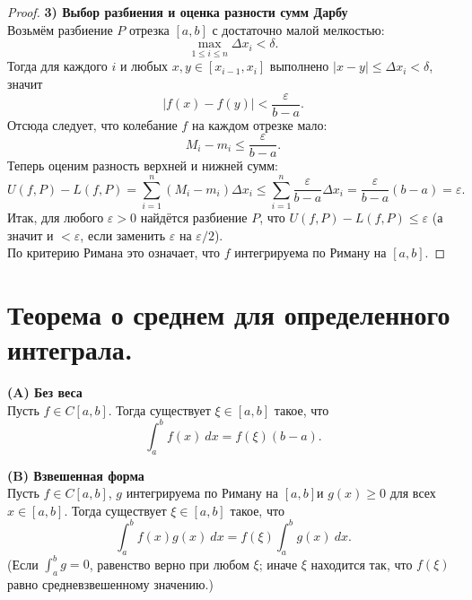 \documentclass[14pt]{extreport}
\begin{document}
\begin{proof}
        \textbf{3) Выбор разбиения и оценка разности сумм Дарбу}\\
        Возьмём разбиение $P$ отрезка $[a,b]$ с достаточно малой мелкостью:
        \[
        \max_{1 \leq i \leq n} \Delta x_i < \delta.
        \]
        Тогда для каждого $i$ и любых $x,y \in [x_{i-1},x_i]$ выполнено $|x-y| \leq \Delta x_i < \delta$, значит 
        \[
        |f(x) - f(y)| < \frac{\varepsilon}{b-a}.
        \]
        Отсюда следует, что колебание $f$ на каждом отрезке мало:
        \[
        M_i - m_i \leq \frac{\varepsilon}{b-a}.
        \]
        Теперь оценим разность верхней и нижней сумм:
        \[
        U(f,P) - L(f,P) = \sum_{i=1}^n (M_i - m_i) \Delta x_i \leq \sum_{i=1}^n \frac{\varepsilon}{b-a} \Delta x_i = \frac{\varepsilon}{b-a} (b-a) = \varepsilon.
        \]
        Итак, для любого $\varepsilon>0$ найдётся разбиение $P$, что $U(f,P) - L(f,P) \leq \varepsilon$ (а значит и $<\varepsilon$, если заменить $\varepsilon$ на $\varepsilon/2$).\\
        По критерию Римана это означает, что $f$ интегрируема по Риману на $[a,b]$.
    \end{proof}



    \chapter{Теорема о среднем для определенного интеграла.}

    \begin{theorem}
        \textbf{(A) Без веса}\\
        Пусть $f \in C[a,b]$. Тогда существует $\xi \in [a,b]$ такое, что
        \[
        \int_a^b f(x)\ dx = f(\xi) (b-a).
        \]

        \textbf{(B) Взвешенная форма}\\
        Пусть $f \in C[a,b]$, $g$ интегрируема по Риману на $[a,b]$и $g(x) \geq 0$ для всех $x \in [a,b]$. Тогда существует $\xi \in [a,b]$ такое, что
        \[
        \int_a^b f(x) g(x)\ dx = f(\xi) \int_a^b g(x)\ dx.
        \]
        (Если $\int_a^b g = 0$, равенство верно при любом $\xi$; иначе $\xi$ находится так, что $f(\xi)$ равно средневзвешенному значению.)
    \end{theorem}
\end{document}
